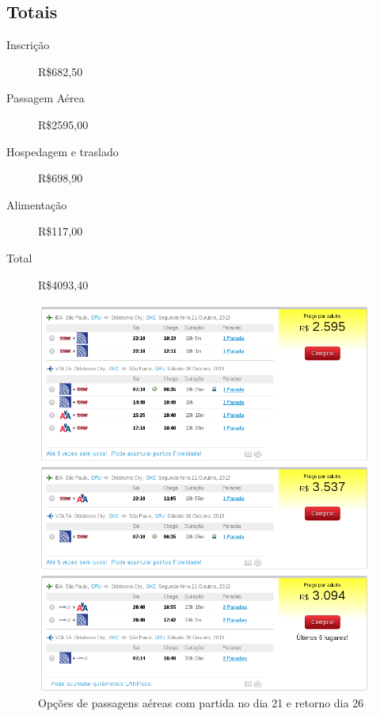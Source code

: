 \documentclass[brazil]{article}
\begin{document}
\subsection{Totais}
\begin{description}
	\item[Inscrição] R\$682,50
	\item[Passagem Aérea] R\$2595,00
	\item[Hospedagem e traslado] R\$698,90
	\item[Alimentação] R\$117,00
	\item[Total] R\$4093,40
\end{description}

\begin{figure}[htp]
\begin{center}
  \includegraphics[width=\linewidth]{21-26.png}
  \caption[Opções de passagens aéreas com partida no dia 21 e retorno dia 26]{Opções de passagens aéreas com partida no dia 21 e retorno dia 26}
\end{center}
\end{figure}
\end{document}
